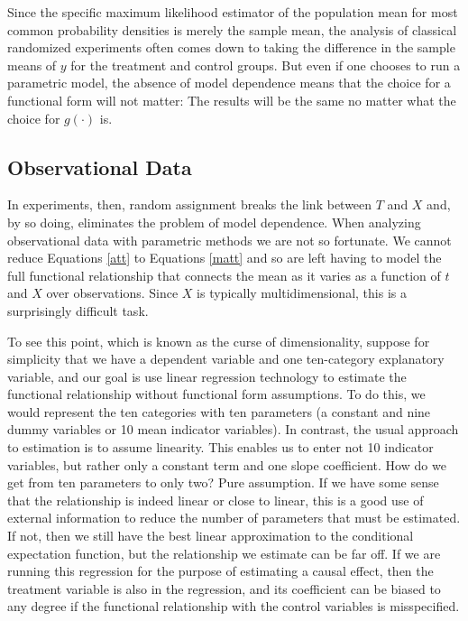 \documentclass[11pt,titlepage]{article}
\begin{document}
Since the specific maximum likelihood estimator of the population mean
for most common probability densities is merely the sample mean, the
analysis of classical randomized experiments often comes down to
taking the difference in the sample means of $y$ for the treatment and
control groups.  But even if one chooses to run a parametric model,
the absence of model dependence means that the choice for a functional
form will not matter: The results will be the same no matter what the
choice for $g(\cdot)$ is.

\subsection{Observational Data} \label{s:paraobs}

In experiments, then, random assignment breaks the link between $T$
and $X$ and, by so doing, eliminates the problem of model dependence.
When analyzing observational data with parametric methods we are not
so fortunate.  We cannot reduce Equations \ref{att} to Equations
\ref{matt} and so are left having to model the full functional
relationship that connects the mean as it varies as a function of $t$
and $X$ over observations.  Since $X$ is typically multidimensional,
this is a surprisingly difficult task.

To see this point, which is known as the curse of dimensionality,
suppose for simplicity that we have a dependent variable and one
ten-category explanatory variable, and our goal is use linear
regression technology to estimate the functional relationship without
functional form assumptions.  To do this, we would represent the ten
categories with ten parameters (a constant and nine dummy variables or
10 mean indicator variables).  In contrast, the usual approach to
estimation is to assume linearity.  This enables us to enter not 10
indicator variables, but rather only a constant term and one slope
coefficient.  How do we get from ten parameters to only two?  Pure
assumption.  If we have some sense that the relationship is indeed
linear or close to linear, this is a good use of external information
to reduce the number of parameters that must be estimated.  If not,
then we still have the best linear approximation to the conditional
expectation function, but the relationship we estimate can be far off.
If we are running this regression for the purpose of estimating a
causal effect, then the treatment variable is also in the regression,
and its coefficient can be biased to any degree if the functional
relationship with the control variables is misspecified.
\end{document}
